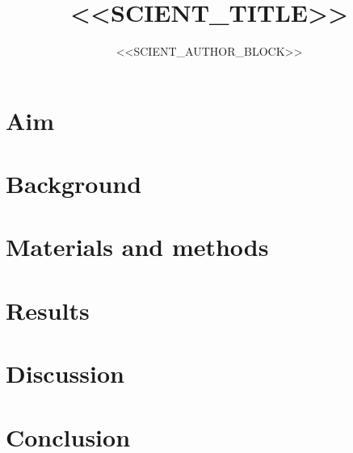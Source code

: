 \documentclass[11pt,a4paper]{article}
\title{<<SCIENT_TITLE>>}
\author{<<SCIENT_AUTHOR_BLOCK>>}
\date{}
\begin{document}
\maketitle

\begin{abstract}
\end{abstract}

\section{Aim}
\par

\section{Background}
\par

\section{Materials and methods}
\par

\section{Results}
\par

\section{Discussion}
\par

\section{Conclusion}
\par



\end{document}

